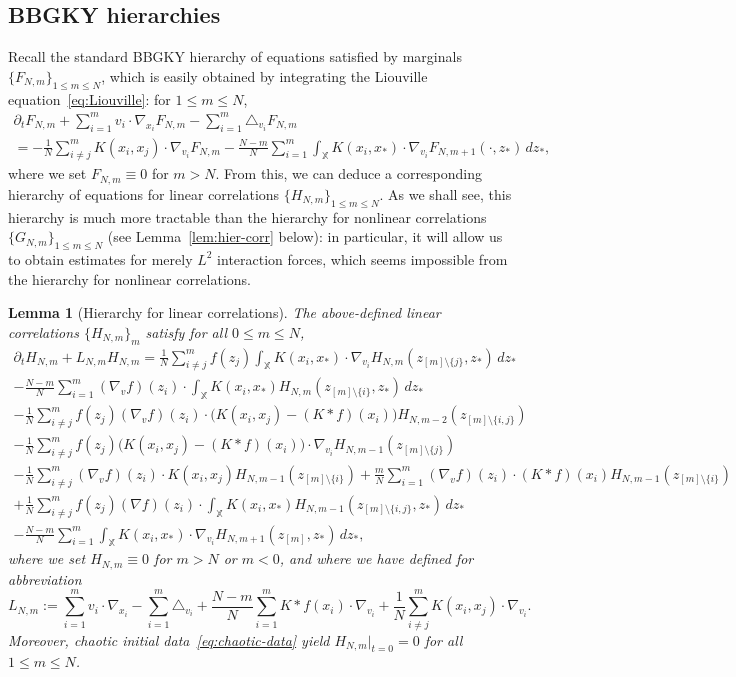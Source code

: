 \documentclass[a4paper,11pt,reqno,noindent]{amsart}
\theoremstyle{plain}
\newtheorem{lem}[theor]{Lemma}
\theoremstyle{definition}
\numberwithin{equation}{section}
\newcommand{\Xd}{\mathbb X}
\begin{document}
\subsection{BBGKY hierarchies}
Recall the standard BBGKY hierarchy of equations satisfied by marginals $\{F_{N,m}\}_{1\le m\le N}$, which is easily obtained by integrating the Liouville equation~\eqref{eq:Liouville}: for $1\le m\le N$,
\begin{multline}\label{eq:BBGKY0}
\partial_tF_{N,m}+\sum_{i=1}^mv_i\cdot\nabla_{x_i}F_{N,m}-\sum_{i=1}^m\triangle_{v_i}F_{N,m}\\
=-\frac1N\sum_{i\ne j}^mK(x_i,x_j)\cdot\nabla_{v_i}F_{N,m}-\frac{N-m}N\sum_{i=1}^m\int_\Xd K(x_i,x_*)\cdot\nabla_{v_i}F_{N,m+1}(\cdot,z_*)\,dz_*,
\end{multline}
where we set $F_{N,m}\equiv0$ for $m>N$.
From this, we can deduce a corresponding hierarchy of equations for linear correlations $\{H_{N,m}\}_{1\le m\le N}$.
As we shall see, this hierarchy is much more tractable than the hierarchy for nonlinear correlations $\{G_{N,m}\}_{1\le m\le N}$ (see Lemma~\ref{lem:hier-corr} below): in particular, it will allow us to obtain estimates for merely $L^2$ interaction forces, which seems impossible from the hierarchy for nonlinear correlations.

\begin{lem}[Hierarchy for linear correlations]\label{lem:BBGKY-HNm}
The above-defined linear correlations $\{H_{N,m}\}_m$ satisfy for all $0\le m\le N$,
\begin{multline*}
\partial_tH_{N,m}+L_{N,m}H_{N,m}=
\frac{1}N\sum_{i\ne j}^mf(z_j)\int_\Xd K(x_i,x_*)\cdot\nabla_{v_i}H_{N,m}(z_{[m]\setminus\{j\}},z_*)\,dz_*\\
-\frac{N-m}N\sum_{i=1}^m(\nabla_{v} f)(z_i)\cdot\int_\Xd K(x_i,x_*)H_{N,m}(z_{[m]\setminus\{i\}},z_*)\,dz_*\\
-\frac1N\sum_{i\ne j}^mf(z_j)(\nabla_vf)(z_i)\cdot\Big(K(x_i,x_j)-(K\ast f)(x_i)\Big)H_{N,m-2}(z_{[m]\setminus\{i,j\}})\\
-\frac1N\sum_{i\ne j}^mf(z_j)\Big(K(x_i,x_j)-(K\ast f)(x_i)\Big)\cdot\nabla_{v_i}H_{N,m-1}(z_{[m]\setminus\{j\}})\\
-\frac1N\sum_{i\ne j}^m(\nabla_vf)(z_i)\cdot K(x_i,x_j)H_{N,m-1}(z_{[m]\setminus\{i\}})
+\frac mN\sum_{i=1}^m(\nabla_vf)(z_i)\cdot (K\ast f)(x_i) H_{N,m-1}(z_{[m]\setminus\{i\}})\\
+\frac{1}N\sum_{i\ne j}^mf(z_j)(\nabla f)(z_i)\cdot\int_\Xd K(x_i,x_*)H_{N,m-1}(z_{[m]\setminus\{i,j\}},z_*)\,dz_*\\
-\frac{N-m}N\sum_{i=1}^m\int_\Xd K(x_i,x_*)\cdot\nabla_{v_i}H_{N,m+1}(z_{[m]},z_*)\,dz_*,
\end{multline*}
where we set $H_{N,m}\equiv0$ for $m>N$ or $m<0$, and where we have defined for abbreviation
\begin{equation}\label{eq:def-LNm}
L_{N,m}:=\sum_{i=1}^mv_i\cdot\nabla_{x_i}-\sum_{i=1}^m\triangle_{v_i}
+\frac{N-m}N\sum_{i=1}^mK\ast f(x_i)\cdot\nabla_{v_i}
+\frac1N\sum_{i\ne j}^mK(x_i,x_j)\cdot\nabla_{v_i}.
\end{equation}
Moreover, chaotic initial data~\eqref{eq:chaotic-data} yield $H_{N,m}|_{t=0}=0$ for all $1\le m\le N$.
\end{lem}
\end{document}
